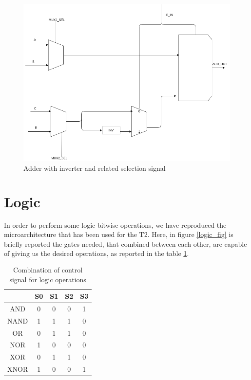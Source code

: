 \begin{figure}
	\includegraphics[width=\textwidth]{chapters/figures/adder}
	\caption{Adder with inverter and related selection signal}
	\label{adder_fig}
\end{figure}


\section{Logic}

In order to perform some logic bitwise operations, we have reproduced the microarchitecture that has been used for the \textsf{T2}. Here, in figure \ref{logic_fig} is briefly reported the gates needed, that combined between each other, are capable of giving us the desired operations, as reported in the table \ref{logicT2_table}.

\begin{table}[ht]
	\centering
	\begin{tabular}{c|cccc}
		\toprule
				& S0 	& S1	& S2	& S3 \\
		\midrule
		AND		& 0		& 0		& 0		& 1	 \\
		NAND	& 1		& 1		& 1		& 0	 \\
		OR		& 0		& 1		& 1		& 0	 \\
		NOR		& 1		& 0		& 0		& 0	 \\
		XOR		& 0		& 1		& 1		& 0	 \\
		XNOR	& 1		& 0		& 0		& 1	 \\
		\bottomrule
	\end{tabular}
	\caption{Combination of control signal for logic operations}
	\label{logicT2_table} %
\end{table}

